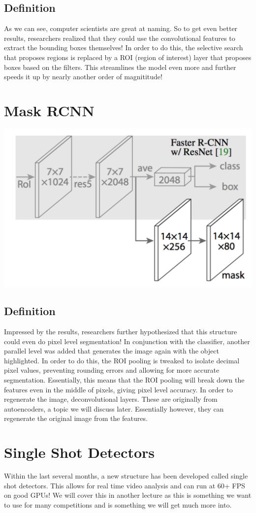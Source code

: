 \documentclass{article}
\begin{document}
\subsection{Definition}
As we can see, computer scientists are great at naming. So to get even better results, researchers realized that they could use the convolutional features to extract the bounding boxes themselves! In order to do this, the selective search that proposes regions is replaced by a ROI (region of interest) layer that proposes boxes based on the filters. This streamlines the model even more and further speeds it up by nearly another order of magnititude!

\section{Mask RCNN}
\begin{center}
\includegraphics[scale=0.5]{maskRCNN}
\end{center}
\subsection{Definition}
Impressed by the results, researchers further hypothesized that this structure could even do pixel level segmentation! In conjunction with the classifier, another parallel level was added that generates the image again with the object highlighted. In order to do this, the ROI pooling is tweaked to isolate decimal pixel values, preventing rounding errors and allowing for more accurate segmentation. Essentially, this means that the ROI pooling will break down the features even in the middle of pixels, giving pixel level accuracy. In order to regenerate the image, deconvolutional layers. These are originally from autoencoders, a topic we will discuss later. Essentially however, they can regenerate the original image from the features.

\section{Single Shot Detectors}
Within the last several months, a new structure has been developed called single shot detectors. This allows for real time video analysis and can run at 60+ FPS on good GPUs! We will cover this in another lecture as this is something we want to use for many competitions and is something we will get much more into.
\end{document}
